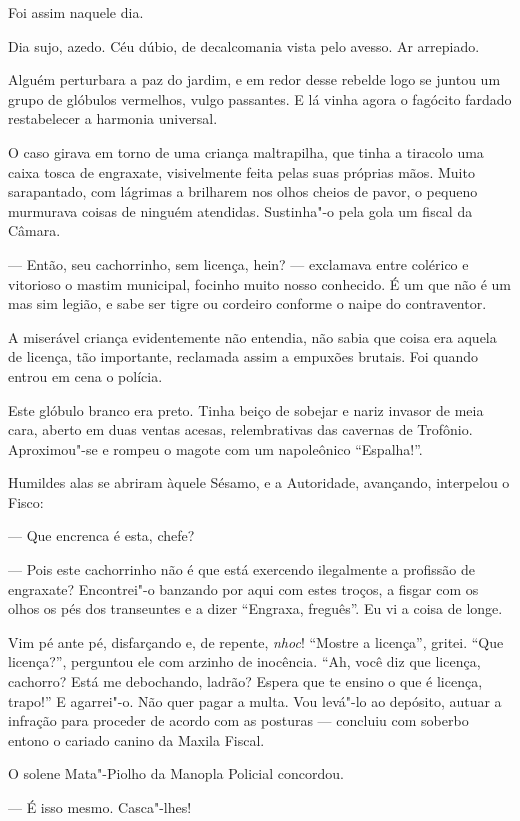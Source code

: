 Foi assim naquele dia.

Dia sujo, azedo. Céu dúbio, de decalcomania vista pelo avesso. Ar
arrepiado.

Alguém perturbara a paz do jardim, e em redor desse rebelde logo se
juntou um grupo de glóbulos vermelhos, vulgo passantes. E lá vinha agora
o fagócito fardado restabelecer a harmonia universal.

O caso girava em torno de uma criança maltrapilha, que tinha a tiracolo
uma caixa tosca de engraxate, visivelmente feita pelas suas próprias
mãos. Muito sarapantado, com lágrimas a brilharem nos olhos cheios de
pavor, o pequeno murmurava coisas de ninguém atendidas. Sustinha"-o pela
gola um fiscal da Câmara.

--- Então, seu cachorrinho, sem licença, hein? --- exclamava entre
colérico e vitorioso o mastim municipal, focinho muito nosso conhecido.
É um que não é um mas sim legião, e sabe ser tigre ou cordeiro conforme
o naipe do contraventor.

A miserável criança evidentemente não entendia, não sabia que coisa era
aquela de licença, tão importante, reclamada assim a empuxões brutais.
Foi quando entrou em cena o polícia.

Este glóbulo branco era preto. Tinha beiço de sobejar e nariz invasor de
meia cara, aberto em duas ventas acesas, relembrativas das cavernas de
Trofônio. Aproximou"-se e rompeu o magote com um napoleônico
``Espalha!''.

Humildes alas se abriram àquele Sésamo, e a Autoridade, avançando,
interpelou o Fisco:

--- Que encrenca é esta, chefe?

--- Pois este cachorrinho não é que está exercendo ilegalmente a
profissão de engraxate? Encontrei"-o banzando por aqui com estes troços,
a fisgar com os olhos os pés dos transeuntes e a dizer ``Engraxa,
freguês''. Eu vi a coisa de longe.

Vim pé ante pé, disfarçando e, de repente, \emph{nhoc}! ``Mostre a
licença'', gritei. ``Que licença?'', perguntou ele com arzinho de
inocência. ``Ah, você diz que licença, cachorro? Está me debochando,
ladrão? Espera que te ensino o que é licença, trapo!'' E agarrei"-o. Não
quer pagar a multa. Vou levá"-lo ao depósito, autuar a infração para
proceder de acordo com as posturas --- concluiu com soberbo entono o
cariado canino da Maxila Fiscal.

O solene Mata"-Piolho da Manopla Policial concordou.

--- É isso mesmo. Casca"-lhes!

